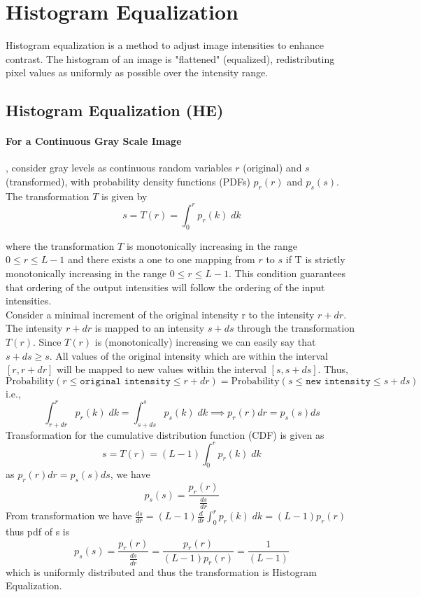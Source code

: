 \section{Histogram Equalization}
\label{lec_02_sec_02}

Histogram equalization is a method to adjust image intensities to enhance contrast. The histogram of an image is "flattened" (equalized), redistributing pixel values as uniformly as possible over the intensity range.\cite{stathaki2014histeq}
\subsection{Histogram Equalization (HE)}

\paragraph{For a Continuous Gray Scale Image}, consider gray levels as continuous random variables $ r $ (original) and $ s $ (transformed), with probability density functions (PDFs) $p_r(r)$ and $ p_s(s) $. The transformation $T$ is given by
$$
s = T(r) = \int_0^r p_r(k)\;dk
$$

where the transformation $T$ is monotonically increasing in the range $ 0 \le r \le L-1$ and there exists a one to one mapping from $r$ to $s$ if T is strictly monotonically increasing in the range $ 0 \le r \le L-1$. This condition guarantees that ordering of the output intensities will follow the ordering of the input intensities.\\

Consider a minimal increment of the original intensity r to the intensity $r +
dr$. The intensity $r + dr$ is mapped to an intensity $s + ds$ through the
transformation $T(r)$. Since $T(r)$ is (monotonically) increasing we can easily say that $s + ds \ge s$. All values of the original intensity which are within the interval $[r, r + dr]$ will be mapped to new values within the interval $[s, s + ds]$. Thus, $$\text{Probability}(r \le \texttt{original intensity} \le r + dr)=\text{Probability}(s \le \texttt{new intensity} \le s + ds)$$ i.e.,
$$
    \int_{r + dr}^r p_r(k)\;dk = \int_{s + ds}^s p_s(k)\;dk \implies p_r(r)dr = p_s(s)ds
$$
Transformation for the cumulative distribution function (CDF) is given as 
$$
s = T(r) = (L-1) \int_0^r p_r(k)\;dk
$$
as $p_r(r)dr = p_s(s)ds$, we have $$p_s(s) = \frac{p_r(r)}{\frac{ds}{dr}}$$
From transformation we have $\frac{ds}{dr} = (L-1)  \frac{d}{dr} \int_0^r p_r(k)\;dk = (L-1) p_r(r)$ thus pdf of s is 
$$p_s(s) = \frac{p_r(r)}{\frac{ds}{dr}} = \frac{p_r(r)}{(L-1) p_r(r)} = \frac{1}{(L-1)} $$ which is uniformly distributed and thus the transformation is Histogram Equalization.
